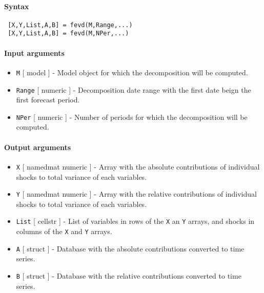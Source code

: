 


	\paragraph{Syntax}
 
 \begin{verbatim}
 [X,Y,List,A,B] = fevd(M,Range,...)
 [X,Y,List,A,B] = fevd(M,NPer,...)
 \end{verbatim}
 
 \paragraph{Input arguments}
 
 \begin{itemize}
 \item
   \texttt{M} {[} model {]} - Model object for which the decomposition
   will be computed.
 \item
   \texttt{Range} {[} numeric {]} - Decomposition date range with the
   first date beign the first forecast period.
 \item
   \texttt{NPer} {[} numeric {]} - Number of periods for which the
   decomposition will be computed.
 \end{itemize}
 
 \paragraph{Output arguments}
 
 \begin{itemize}
 \item
   \texttt{X} {[} namedmat \textbar{} numeric {]} - Array with the
   absolute contributions of individual shocks to total variance of each
   variables.
 \item
   \texttt{Y} {[} namedmat \textbar{} numeric {]} - Array with the
   relative contributions of individual shocks to total variance of each
   variables.
 \item
   \texttt{List} {[} cellstr {]} - List of variables in rows of the
   \texttt{X} an \texttt{Y} arrays, and shocks in columns of the
   \texttt{X} and \texttt{Y} arrays.
 \item
   \texttt{A} {[} struct {]} - Database with the absolute contributions
   converted to time series.
 \item
   \texttt{B} {[} struct {]} - Database with the relative contributions
   converted to time series.
 \end{itemize}
 
